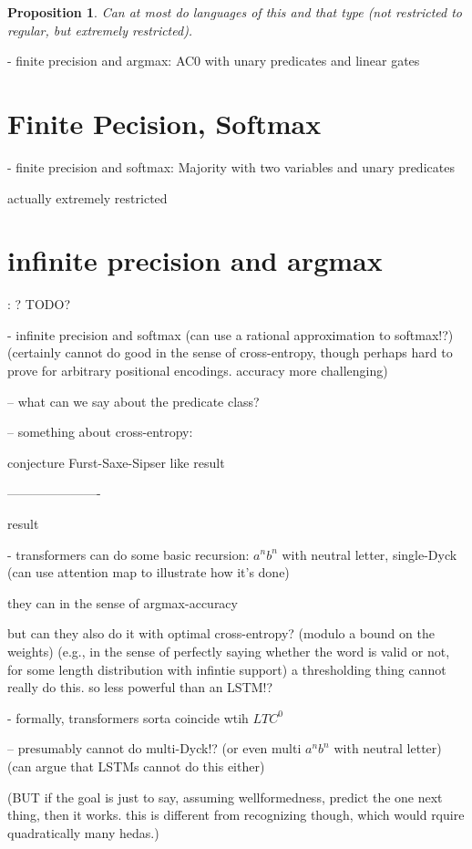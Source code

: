 \documentclass[11pt,a4paper]{article}
\newcounter{theorem}
\newtheorem{proposition}[theorem]{Proposition}
\begin{document}
\begin{proposition}
Can at most do languages of this and that type (not restricted to regular, but extremely restricted).
\end{proposition}

- finite precision and argmax: AC0 with unary predicates and linear gates

\section{Finite Pecision, Softmax}

- finite precision and softmax: Majority with two variables and unary predicates

actually extremely restricted

\section{infinite precision and argmax}: ? TODO?

- infinite precision and softmax (can use a rational approximation to softmax!?) (certainly cannot do good in the sense of cross-entropy, though perhaps hard to prove for arbitrary positional encodings. accuracy more challenging)

-- what can we say about the predicate class?

-- something about cross-entropy:

conjecture Furst-Saxe-Sipser like result


----------------------

result

- transformers can do some basic recursion: $a^nb^n$ with neutral letter, single-Dyck (can use attention map to illustrate how it's done)

they can in the sense of argmax-accuracy

but can they also do it with optimal cross-entropy? (modulo a bound on the weights) (e.g., in the sense of perfectly saying whether the word is valid or not, for some length distribution with infintie support)
a thresholding thing cannot really do this. so less powerful than an LSTM!?

- formally, transformers sorta coincide wtih $LTC^0$

-- presumably cannot do multi-Dyck!? (or even multi $a^nb^n$ with neutral letter) (can argue that LSTMs cannot do this either)

(BUT if the goal is just to say, assuming wellformedness, predict the one next thing, then it works. this is different from recognizing though, which would rquire quadratically many hedas.)
\end{document}
